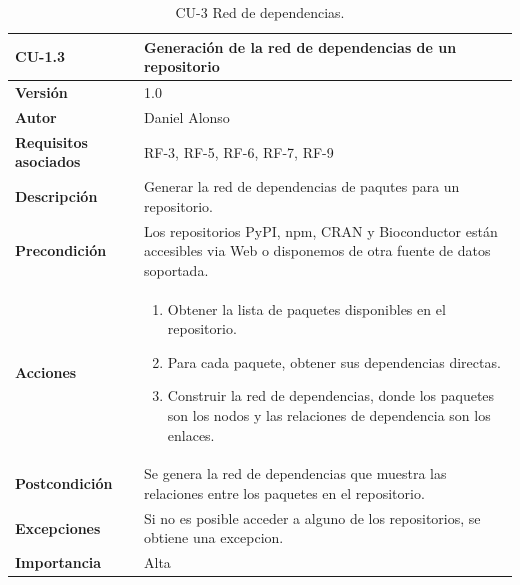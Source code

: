 \begin{table}[p]
	\centering
	\begin{tabularx}{\linewidth}{ p{} p{} }
		\toprule
		\textbf{CU-1.3}               & \textbf{Generación de la red de dependencias de un repositorio}                                                          \\
		\toprule
		\textbf{Versión}              & 1.0                                                                                                                      \\
		\textbf{Autor}                & Daniel Alonso                                                                                                            \\
		\textbf{Requisitos asociados} & RF-3, RF-5, RF-6, RF-7, RF-9                                                                                             \\
		\textbf{Descripción}          & Generar la red de dependencias de paqutes para un repositorio.                                                           \\
		\textbf{Precondición}         & Los repositorios PyPI, npm, CRAN y Bioconductor están accesibles via Web o disponemos de otra fuente de datos soportada. \\
		\textbf{Acciones}             &
		\begin{enumerate}
			\def\labelenumi{\arabic{enumi}.}
			\tightlist
			\item Obtener la lista de paquetes disponibles en el repositorio.
			\item Para cada paquete, obtener sus dependencias directas.
			\item Construir la red de dependencias, donde los paquetes son los nodos y las relaciones de dependencia son los enlaces.
		\end{enumerate}                                 \\
		\textbf{Postcondición}        & Se genera la red de dependencias que muestra las relaciones entre los paquetes en el repositorio.                        \\
		\textbf{Excepciones}          & Si no es posible acceder a alguno de los repositorios, se obtiene una excepcion.                                         \\
		\textbf{Importancia}          & Alta                                                                                                                     \\
		\bottomrule
	\end{tabularx}
	\caption{CU-3 Red de dependencias.}
	\label{tab:cu3}
\end{table}

